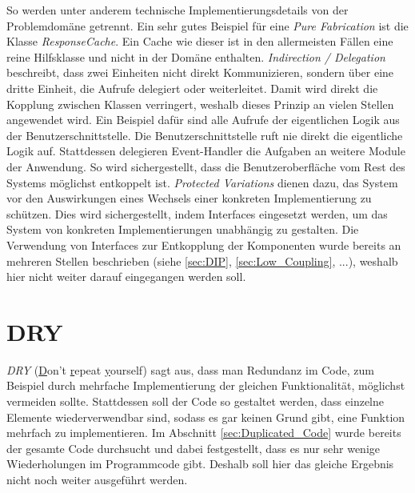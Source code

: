 So werden unter anderem technische Implementierungsdetails von der Problemdomäne getrennt.
Ein sehr gutes Beispiel für eine \textit{Pure Fabrication} ist die Klasse \textit{ResponseCache}. 
Ein Cache wie dieser ist in den allermeisten Fällen eine reine Hilfsklasse und nicht in der Domäne enthalten.
\newline
\newline
\textit{Indirection / Delegation} beschreibt, dass zwei Einheiten nicht direkt Kommunizieren, sondern über eine dritte Einheit, die Aufrufe delegiert oder weiterleitet.
Damit wird direkt die Kopplung zwischen Klassen verringert, weshalb dieses Prinzip an vielen Stellen angewendet wird.
Ein Beispiel dafür sind alle Aufrufe der eigentlichen Logik aus der Benutzerschnittstelle.
Die Benutzerschnittstelle ruft nie direkt die eigentliche Logik auf.
Stattdessen delegieren Event-Handler die Aufgaben an weitere Module der Anwendung.
So wird sichergestellt, dass die Benutzeroberfläche vom Rest des Systems möglichst entkoppelt ist.
\newline
\newline
\textit{Protected Variations} dienen dazu, das System vor den Auswirkungen eines Wechsels einer konkreten Implementierung zu schützen.
Dies wird sichergestellt, indem Interfaces eingesetzt werden, um das System von konkreten Implementierungen unabhängig zu gestalten.
Die Verwendung von Interfaces zur Entkopplung der Komponenten wurde bereits an mehreren Stellen beschrieben (siehe \ref{sec:DIP}, \ref{sec:Low_Coupling}, ...), weshalb hier nicht weiter darauf eingegangen werden soll.

\section{DRY}
\textit{DRY} (\underline{D}on't \underline{r}epeat \underline{y}ourself) sagt aus, dass man Redundanz im Code, zum Beispiel durch mehrfache Implementierung der gleichen Funktionalität, möglichst vermeiden sollte.
Stattdessen soll der Code so gestaltet werden, dass einzelne Elemente wiederverwendbar sind, sodass es gar keinen Grund gibt, eine Funktion mehrfach zu implementieren.
Im Abschnitt \ref{sec:Duplicated_Code} wurde bereits der gesamte Code durchsucht und dabei festgestellt, dass es nur sehr wenige Wiederholungen im Programmcode gibt.
Deshalb soll hier das gleiche Ergebnis nicht noch weiter ausgeführt werden.